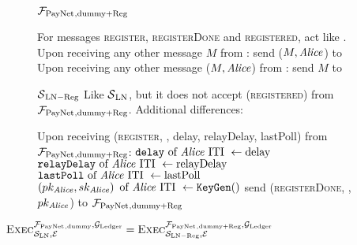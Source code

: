 \begin{figure}[!htbp]
\begin{systembox}{$\mathcal{F}_{\mathrm{PayNet}}{}_{\mathrm{, dummy + Reg}}$}
  \begin{algorithmic}[1]
    \State For messages \textsc{register}, \textsc{registerDone} and
    \textsc{registered}, act like \fpaynet{}.
    \State Upon receiving any other message $M$ from \alice: send ($M, \mathit{Alice}$)
    to \simulator
    \State Upon receiving any other message ($M, \mathit{Alice}$) from \simulator: send
    $M$ to \alice
  \end{algorithmic}
\end{systembox}
\caption{}
\label{alg:fpaynet:reg}
\end{figure}

\begin{figure}[!htbp]
\begin{simulatorbox}{$\mathcal{S}{}_{\mathrm{LN - Reg}}$}
  Like $\mathcal{S}{}_{\mathrm{LN}}$, but it does not accept
  (\textsc{registered}) from $\mathcal{F}_{\mathrm{PayNet}}{}_{\mathrm{, dummy + Reg}}$. Additional
  differences:
  \begin{algorithmic}[1]
    \State Upon receiving (\textsc{register}, \alice, delay, relayDelay,
    lastPoll) from $\mathcal{F}_{\mathrm{PayNet}}{}_{\mathrm{, dummy + Reg}}$:
    \Indent
      \State $\mathtt{delay} \text{ of \ensuremath{\mathit{Alice}}{} ITI } \gets \mathrm{delay}$
      \label{alg:sim:reg:delay}
      \State $\mathtt{relayDelay} \text{ of \ensuremath{\mathit{Alice}}{} ITI } \gets
      \mathrm{relayDelay}$
      \State $\mathtt{lastPoll} \text{ of \ensuremath{\mathit{Alice}}{} ITI } \gets
      \mathrm{lastPoll}$
      \State $\left(pk_{\mathit{Alice}}, sk_{\mathit{Alice}}\right) \text{ of \ensuremath{\mathit{Alice}}{} ITI }
      \gets \mathtt{KeyGen}()$
      \label{alg:sim:reg:keygen}
      \State send (\textsc{registerDone}, \alice, $pk_{\mathit{Alice}}$) to
      $\mathcal{F}_{\mathrm{PayNet}}{}_{\mathrm{, dummy + Reg}}$
    \EndIndent
  \end{algorithmic}
\end{simulatorbox}
\caption{}
\label{alg:sim:reg}
\end{figure}

\begin{lemma}
  \label{lemma:reg}
  $\textsc{Exec}^{\mathcal{F}_{\mathrm{PayNet}}{}_{\mathrm{, dummy}},
  \mathcal{G}_{\mathrm{Ledger}}}_{\mathcal{S}_{\mathrm{LN}}, \mathcal{E}} =
  \textsc{Exec}^{\mathcal{F}_{\mathrm{PayNet}}{}_{\mathrm{, dummy + Reg}},
  \mathcal{G}_{\mathrm{Ledger}}}_{\mathcal{S}_{\mathrm{LN - Reg}}, \mathcal{E}}$
\end{lemma}

